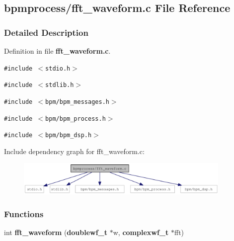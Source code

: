 \subsection{bpmprocess/fft\_\-waveform.c File Reference}
\label{fft__waveform_8c}


\subsubsection{Detailed Description}


Definition in file {\bf fft\_\-waveform.c}.

{\tt \#include $<$stdio.h$>$}\par
{\tt \#include $<$stdlib.h$>$}\par
{\tt \#include $<$bpm/bpm\_\-messages.h$>$}\par
{\tt \#include $<$bpm/bpm\_\-process.h$>$}\par
{\tt \#include $<$bpm/bpm\_\-dsp.h$>$}\par


Include dependency graph for fft\_\-waveform.c:\nopagebreak
\begin{figure}[H]
\begin{center}
\leavevmode
\includegraphics[width=293pt]{fft__waveform_8c__incl}
\end{center}
\end{figure}
\subsubsection*{Functions}
\begin{CompactItemize}
\item 
int {\bf fft\_\-waveform} ({\bf doublewf\_\-t} $\ast$w, {\bf complexwf\_\-t} $\ast$fft)
\end{CompactItemize}

